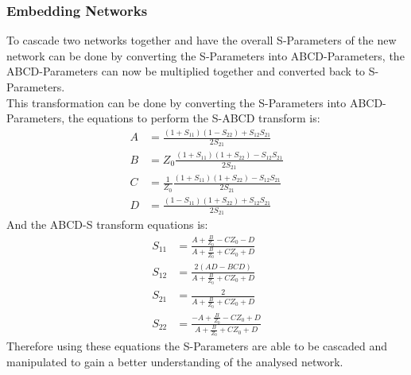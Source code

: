 \documentclass[12pt,openany,a4paper]{book}
\begin{document}
\subsubsection{Embedding Networks}
To cascade two networks together and have the overall S-Parameters of the new network can be done by converting the S-Parameters into ABCD-Parameters, the ABCD-Parameters can now be multiplied together and converted back to S-Parameters. \\
This transformation can be done by converting the S-Parameters into ABCD-Parameters, the equations to perform the S-ABCD transform is:
\begin{align}
A&= \frac{(1+S_{11})(1-S_{22})+S_{12}S_{21}}{2S_{21}} \\
B&= Z_0\frac{(1+S_{11})(1+S_{22})-S_{12}S_{21}}{2S_{21}} \\
C&= \frac{1}{Z_0}  \frac{(1+S_{11})(1+S_{22})-S_{12}S_{21}}{2S_{21}} \\
D&= \frac{(1-S_{11})(1+S_{22})+S_{12}S_{21}}{2S_{21}} 
\end{align}
And the ABCD-S transform equations is:
\begin{align}
S_{11} &= \frac{A+\tfrac{B}{Z_0} - CZ_0-D}{A+\tfrac{B}{Z_0} + CZ_0+D} \\
S_{12} &= \frac{2(AD-BCD)}{A+\tfrac{B}{Z_0} + CZ_0+D}\\
S_{21} &= \frac{2}{A+\tfrac{B}{Z_0} + CZ_0+D} \\
S_{22} &= \frac{-A+\tfrac{B}{Z_0}- CZ_0+D}{A+\tfrac{B}{Z_0} + CZ_0+D}
\end{align}
Therefore using these equations the S-Parameters are able to be cascaded and manipulated to gain a better understanding of the analysed network. \cite{}
\end{document}
